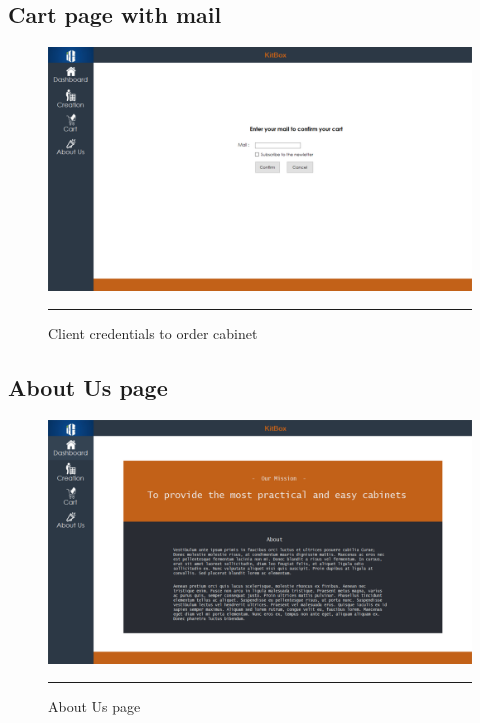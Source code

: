     \newpage
	\subsection{Cart page with mail}
    	\vfill
        \begin{figure}[h!]
            \centering
    		\includegraphics[width =1.2\textwidth,angle = 90]{Figures/CartPageMail.PNG}
    		\rule{35em}{0.5pt}
    		\caption{Client credentials to order cabinet}
    		\label{authtab}
    	\end{figure}
    	\vfill
    	
    \newpage
	\subsection{About Us page}
    	\vfill
        \begin{figure}[h!]
            \centering
    		\includegraphics[width =1.2\textwidth,angle = 90]{Figures/AboutUs.PNG}
    		\rule{35em}{0.5pt}
    		\caption{About Us page}
    		\label{aboutus}
    	\end{figure}
    	\vfill

